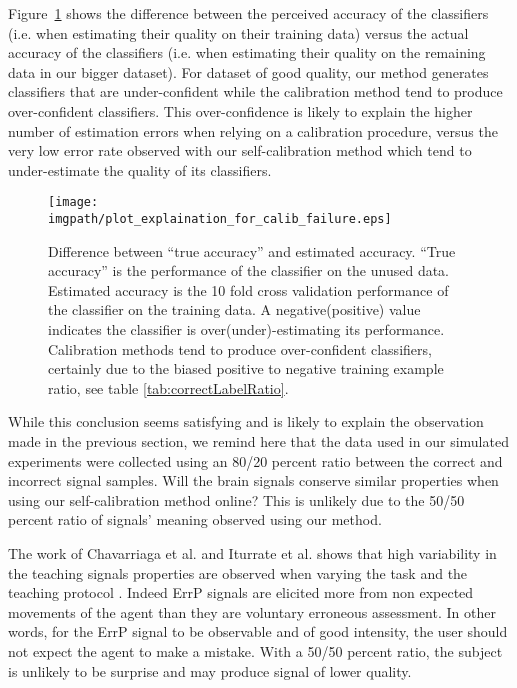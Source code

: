 
Figure~\ref{fig:calibFail} shows the difference between the perceived accuracy of the classifiers (i.e. when estimating their quality on their training data) versus the actual accuracy of the classifiers (i.e. when estimating their quality on the remaining data in our bigger dataset). For dataset of good quality, our method generates classifiers that are under-confident while the calibration method tend to produce over-confident classifiers. This over-confidence is likely to explain the higher number of estimation errors when relying on a calibration procedure, versus the very low error rate observed with our self-calibration method which tend to under-estimate the quality of its classifiers.

\begin{figure}[!htbp]
\centering
\texttt{[image: \\imgpath/plot\_explaination\_for\_calib\_failure.eps]}
\caption{Difference between ``true accuracy'' and estimated accuracy. ``True accuracy'' is the performance of the classifier on the unused data. Estimated accuracy is the 10 fold cross validation performance of the classifier on the training data. A negative(positive) value indicates the classifier is over(under)-estimating its performance. Calibration methods tend to produce over-confident classifiers, certainly due to the biased positive to negative training example ratio, see table \ref{tab:correctLabelRatio}.}
\label{fig:calibFail}
\end{figure}

While this conclusion seems satisfying and is likely to explain the observation made in the previous section, we remind here that the data used in our simulated experiments were collected using an 80/20 percent ratio between the correct and incorrect signal samples. Will the brain signals conserve similar properties when using our self-calibration method online? This is unlikely due to the 50/50 percent ratio of signals' meaning observed using our method. 

The work of Chavarriaga et al. and Iturrate et al. shows that high variability in the teaching signals properties are observed when varying the task and the teaching protocol \cite{chavarriaga2010learning, iturrate2013task}. Indeed ErrP signals are elicited more from non expected movements of the agent than they are voluntary erroneous assessment. In other words, for the ErrP signal to be observable and of good intensity, the user should not expect the agent to make a mistake. With a 50/50 percent ratio, the subject is unlikely to be surprise and may produce signal of lower quality.

